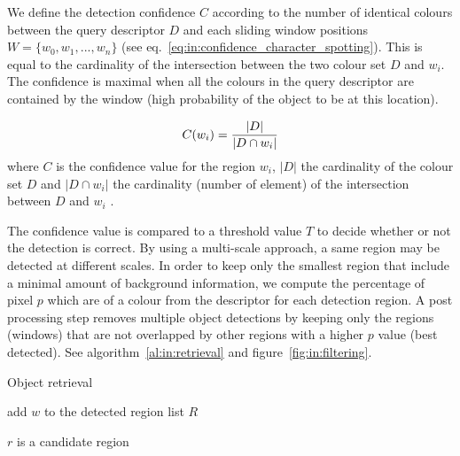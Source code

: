 We define the detection confidence $C$ according to the number of identical colours between the query descriptor $D$ and each sliding window positions $W=\{w_0,w_1,...,w_n\}$ (see eq.~\ref{eq:in:confidence_character_spotting}). This is equal to the cardinality of the intersection between the two colour set $D$ and $w_i$. The confidence is maximal when all the colours in the query descriptor are contained by the window (high probability of the object to be at this location).

\begin{equation}\label{eq:in:confidence_character_spotting}
   C(w_i) = \frac{|D|}{|D \cap w_i|}\\
 \end{equation}
where $C$ is the confidence value for the region $w_i$, $|D|$ the cardinality of the colour set $D$ and $|D \cap w_i|$ the cardinality (number of element) of the intersection between $D$ and $w_i$ .

The confidence value is compared to a threshold value $T$ to decide whether or not the detection is correct. By using a multi-scale approach, a same region may be detected at different scales. In order to keep only the smallest region that include a minimal amount of background information, we compute the percentage of pixel $p$ which are of a colour from the descriptor for each detection region. 
A post processing step removes multiple object detections by keeping only the regions (windows) that are not overlapped by other regions with a higher $p$ value (best detected). See algorithm~\ref{al:in:retrieval} and figure~\ref{fig:in:filtering}.

\begin{algorithm}
\caption{Object retrieval}
\label{al:in:retrieval}
\begin{algorithmic}
  
    
	\STATE add $w$ to the detected region list $R$
    \ENDIF  
  \ENDFOR
\ENDFOR

\STATE{}
	     \STATE $r$ is a candidate region
    \ENDIF
\ENDFOR
\end{algorithmic}
\end{algorithm}



